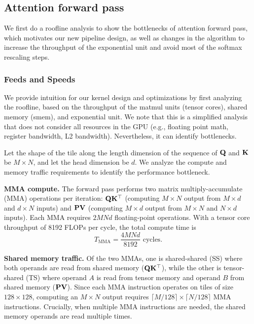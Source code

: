 \subsection{Attention forward pass}
\label{sec:fwd}



We first do a roofline analysis to show the bottlenecks of attention forward pass, which motivates our new pipeline design, as well as changes in the \fa algorithm to increase the throughput of the exponential unit and avoid most of the softmax rescaling steps.

\subsubsection{Feeds and Speeds}
\label{sec:fwd-feeds-and-speeds}

We provide intuition for our kernel design and optimizations by first analyzing the roofline, based on the throughput of the matmul units (tensor cores), shared memory (smem), and exponential unit. We note that this is a simplified analysis that does not consider all resources in the GPU (e.g., floating point math, register bandwidth, L2 bandwidth). Nevertheless, it can identify bottlenecks.

Let the shape of the tile along the length dimension of the sequence of $\mathbf{Q}$ and $\mathbf{K}$ be $M \times N$, and let the head dimension be $d$. We analyze the compute and memory traffic requirements to identify the performance bottleneck.

\noindent\textbf{MMA compute.}
The forward pass performs two matrix multiply-accumulate (MMA) operations per iteration: $\mathbf{Q}\mathbf{K}^\top$ (computing $M \times N$ output from $M \times d$ and $d \times N$ inputs) and $\mathbf{P}\mathbf{V}$ (computing $M \times d$ output from $M \times N$ and $N \times d$ inputs). Each MMA requires $2MNd$ floating-point operations. With a tensor core throughput of 8192 FLOPs per cycle, the total compute time is
{\setlength{\abovedisplayskip}{4pt}%
 \setlength{\belowdisplayskip}{4pt}%
 \setlength{\abovedisplayshortskip}{3pt}%
 \setlength{\belowdisplayshortskip}{3pt}%
\begin{equation}
    T_{\text{MMA}} = \frac{4MNd}{8192} \text{ cycles}.
\end{equation}}

\noindent\textbf{Shared memory traffic.}
Of the two MMAs, one is shared-shared (SS) where both operands are read from shared memory ($\mathbf{Q}\mathbf{K}^\top$), while the other is tensor-shared (TS) where operand $A$ is read from tensor memory and operand $B$ from shared memory ($\mathbf{P}\mathbf{V}$). Since each MMA instruction operates on tiles of size $128 \times 128$, computing an $M \times N$ output requires $\lceil M/128 \rceil \times \lceil N/128 \rceil$ MMA instructions. Crucially, when multiple MMA instructions are needed, the shared memory operands are read multiple times.

